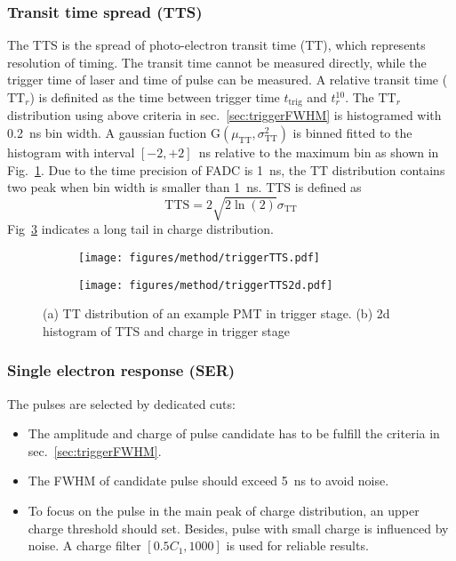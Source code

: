 \subsubsection{Transit time spread (TTS)}
The TTS is the spread of photo-electron transit time (TT), which represents resolution of timing. The transit time cannot be measured directly, while the trigger time of laser and time of pulse can be measured. A relative transit time ($\mathrm{TT}_r$) is definited as the time between trigger time $t_{\mathrm{trig}}$ and $t_r^{10}$. The $\mathrm{TT}_r$ distribution using above criteria in sec.~\ref{sec:triggerFWHM} is histogramed with \SI{0.2}{ns} bin width. A gaussian fuction G$(\mu_{\mathrm{TT}},\sigma_{\mathrm{TT}}^2)$ is binned fitted to the histogram with interval $[-2,+2]$\, ns relative to the maximum bin as shown in Fig.~\ref{fig:triggerTTS}. Due to the time precision of FADC is \SI{1}{ns}, the TT distribution contains two peak when bin width is smaller than \SI{1}{ns}. TTS is defined as
\begin{equation}
    \mathrm{TTS}=2\sqrt{2\ln(2)}\sigma_{\mathrm{TT}}
\end{equation}
Fig~\ref{fig:triggerTTS2d} indicates a long tail in charge distribution.
\begin{figure}[!htbp]
    \centering
    \begin{subfigure}[t]{0.49\textwidth}
        \texttt{[image: figures/method/triggerTTS.pdf]}
        \caption{}
        \label{fig:triggerTTS}
    \end{subfigure}
    \begin{subfigure}[t]{0.49\textwidth}
        \texttt{[image: figures/method/triggerTTS2d.pdf]}
        \caption{}
        \label{fig:triggerTTS2d}
    \end{subfigure}
    \caption{(a) TT distribution of an example PMT in trigger stage. (b) 2d histogram of TTS and charge in trigger stage}
\end{figure}

\subsubsection{Single electron response (SER)}
The pulses are selected by dedicated cuts:
\begin{itemize}
    \item[1] The amplitude and charge of pulse candidate has to be fulfill the criteria in sec.~\ref{sec:triggerFWHM}.
    \item[2] The FWHM of candidate pulse should exceed \SI{5}{ns} to avoid noise.
    \item[3] To focus on the pulse in the main peak of charge distribution, an upper charge threshold should set. Besides, pulse with small charge is influenced by noise. A charge filter $[0.5C_1, 1000]$ is used for reliable results.
\end{itemize}

